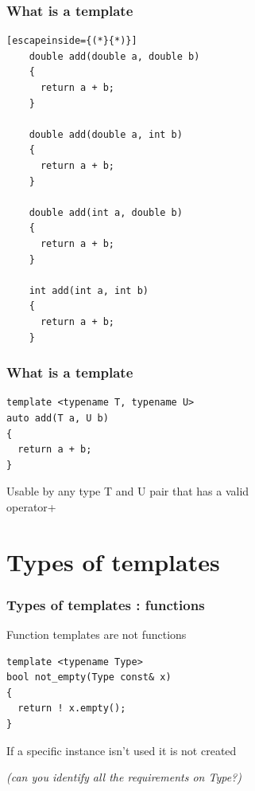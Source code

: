 \documentclass[14pt]{beamer}
\begin{document}
\begin{frame}[fragile]
  \frametitle{What is a template}

  \begin{lstlisting}[escapeinside={(*}{*)}]
    double add(double a, double b)
    {
      return a + b;
    }

    double add(double a, int b)
    {
      return a + b;
    }

    double add(int a, double b)
    {
      return a + b;
    }

    int add(int a, int b)
    {
      return a + b;
    }
  \end{lstlisting}

\end{frame}

\begin{frame}[fragile]
  \frametitle{What is a template}

  \begin{lstlisting}[basicstyle=\codefontsize{12pt}]
template <typename T, typename U>
auto add(T a, U b)
{
  return a + b;
}
  \end{lstlisting}

  \vspace{.5cm}

  Usable by any type {\color{sblue}T} and {\color{sblue}U} pair that has a valid \\
  {\color{sblue}operator+}

\end{frame}

\section{Types of templates}
\frame{\sectionpage}

\begin{frame}[fragile]
  \frametitle{Types of templates : functions}

  Function templates are not functions

  \vspace{.5cm}

  \begin{lstlisting}[basicstyle=\codefontsize{12pt}]
template <typename Type>
bool not_empty(Type const& x)
{
  return ! x.empty();
}
  \end{lstlisting}

  \vspace{.5cm}

  If a specific instance isn't used it is not created

  \vspace{1mm}

  {\itshape\changefontsize{10pt}%
    (can you identify all the requirements on {\color{sblue}Type}?)}

\end{frame}
\end{document}
